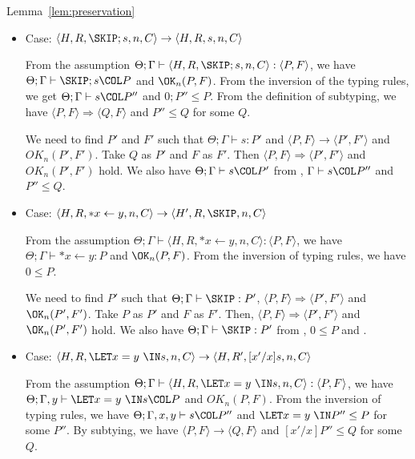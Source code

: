 \begin{pfof}{Lemma~\ref{lem:preservation}}
\begin{itemize}
\item Case: \( \langle H, R, \SKIP;s, n, C \rangle \rightarrow \langle
  H, R, s, n, C \rangle \)

  From the assumption \( \Theta; \Gamma \vdash \langle H, R, \SKIP;s, n,
  C \rangle : \langle P, F \rangle\), we have \(\Theta;\Gamma
  \vdash \SKIP;s\COL P\) and \(\OK_{n}(P, F)\). From the inversion of
  the typing rules, we get \(\Theta; \Gamma \vdash s\COL P''\) and
  \(0;P'' \le P\). From the definition of subtyping, we have \(
  \langle P, F \rangle \Longrightarrow \langle Q, F \rangle\) and \(P''
  \le Q\) for some \(Q\).

  We need to find \(P'\) and \(F'\) such that \(\Theta; \Gamma \vdash s : P'\)
  and \(\langle P, F \rangle \rightarrow \langle P', F' \rangle\)
  and \(OK_n(P', F')\). Take \(Q\) as \(P'\) and \(F\) as \(F'\). Then
  \(\langle P, F\rangle \Longrightarrow \langle P', F' \rangle\) and
  \(OK_n(P', F')\) hold. We also have \(\Theta;\Gamma \vdash s\COL
  P'\) from , \(\Gamma \vdash s\COL P''\) and \(P'' \le Q\).

\item Case: \( \langle H, R, *x \leftarrow y , n, C\rangle \rightarrow
  \langle H', R, \SKIP, n, C\rangle \)

  From the assumption \( \Theta; \Gamma \vdash \langle H, R, *x
  \leftarrow y, n, C \rangle : \langle P, F \rangle\), we have
  \(\Theta; \Gamma \vdash *x \leftarrow y : P\) and \(\OK_{n}(P,
  F)\). From the inversion of typing rules, we have \(0 \le P\).

  We need to find \(P'\) such that \(\Theta; \Gamma \vdash \SKIP:
  P'\), \( \langle P, F \rangle \Longrightarrow \langle P', F'
  \rangle \) and \(\OK_n(P', F')\). Take \(P\) as \(P'\) and \(F\) as
  \(F'\). Then, \( \langle P, F\rangle \Longrightarrow \langle P',
  F'\rangle\) and \(\OK_n(P', F')\) hold. We also have \(\Theta;
  \Gamma \vdash \SKIP: P'\) from , \(0 \le P\) and
  .

\item Case: \( \langle H, R, \LET x = y\ \IN s , n, C \rangle
  \rightarrow \langle H, R', [x'/x]s, n, C \rangle \)

  From the assumption \( \Theta; \Gamma \vdash \langle H, R, \LET x =
  y\ \IN s, n, C \rangle : \langle P, F \rangle\), we have \(\Theta;
  \Gamma, y \vdash \LET x = y \ \IN s \COL P\) and \(OK_{n}(P,
  F)\). From the inversion of typing rules, we have \(\Theta; \Gamma,
  x,y \vdash s\COL P''\) and \( \LET x = y\; \IN P'' \le P\) for some
  \(P''\). By subtying, we have \( \langle P, F \rangle \rightarrow
  \langle Q, F \rangle \) and \([x'/x]P'' \le Q\) for some \(Q\).


\end{itemize}
\end{pfof}
